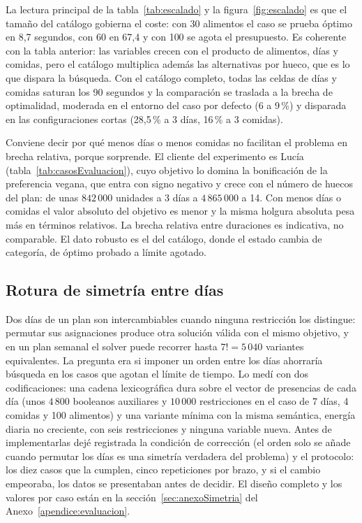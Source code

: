 La lectura principal de la tabla~\ref{tab:escalado} y la figura~\ref{fig:escalado} es que el tamaño del catálogo gobierna el coste: con 30 alimentos el caso se prueba óptimo en 8,7 segundos, con 60 en 67,4 y con 100 se agota el presupuesto. Es coherente con la tabla anterior: las variables crecen con el producto de alimentos, días y comidas, pero el catálogo multiplica además las alternativas por hueco, que es lo que dispara la búsqueda. Con el catálogo completo, todas las celdas de días y comidas saturan los 90 segundos y la comparación se traslada a la brecha de optimalidad, moderada en el entorno del caso por defecto (6 a 9\,\%) y disparada en las configuraciones cortas (28,5\,\% a 3 días, 16\,\% a 3 comidas).

Conviene decir por qué menos días o menos comidas no facilitan el problema en brecha relativa, porque sorprende. El cliente del experimento es Lucía (tabla~\ref{tab:casosEvaluacion}), cuyo objetivo lo domina la bonificación de la preferencia vegana, que entra con signo negativo y crece con el número de huecos del plan: de unas $842\,000$ unidades a 3 días a $4\,865\,000$ a 14. Con menos días o comidas el valor absoluto del objetivo es menor y la misma holgura absoluta pesa más en términos relativos. La brecha relativa entre duraciones es indicativa, no comparable. El dato robusto es el del catálogo, donde el estado cambia de categoría, de óptimo probado a límite agotado.

\subsection{Rotura de simetría entre días}
\label{sec:evalSimetria}

Dos días de un plan son intercambiables cuando ninguna restricción los distingue: permutar sus asignaciones produce otra solución válida con el mismo objetivo, y en un plan semanal el solver puede recorrer hasta $7! = 5\,040$ variantes equivalentes. La pregunta era si imponer un orden entre los días ahorraría búsqueda en los casos que agotan el límite de tiempo. Lo medí con dos codificaciones: una cadena lexicográfica dura sobre el vector de presencias de cada día (unos $4\,800$ booleanos auxiliares y $10\,000$ restricciones en el caso de 7 días, 4 comidas y 100 alimentos) y una variante mínima con la misma semántica, energía diaria no creciente, con seis restricciones y ninguna variable nueva. Antes de implementarlas dejé registrada la condición de corrección (el orden solo se añade cuando permutar los días es una simetría verdadera del problema) y el protocolo: los diez casos que la cumplen, cinco repeticiones por brazo, y si el cambio empeoraba, los datos se presentaban antes de decidir. El diseño completo y los valores por caso están en la sección~\ref{sec:anexoSimetria} del Anexo~\ref{apendice:evaluacion}.

